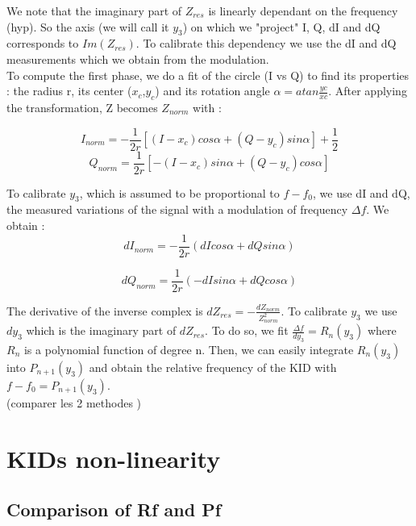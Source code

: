 \documentclass[english,11pt]{report}
\begin{document}
We note that the imaginary part of $Z_{res}$ is linearly dependant on the frequency (hyp). So the axis (we will call it $y_{3}$) on which we "project" I, Q, dI and dQ corresponds to $Im(Z_{res})$. To calibrate this dependency we use the dI and dQ measurements which we obtain from the modulation. \\

To compute the first phase, we do a fit of the circle (I vs Q) to find its properties : the radius r, its center ($x_{c}$,$y_{c}$) and its rotation angle $\alpha = atan \frac{yc}{xc}$. After applying the transformation, Z becomes $Z_{norm}$ with :

\begin{equation}
I_{norm} = - \frac{1}{2r}[(I-x_{c})cos\alpha + (Q - y_{c})sin \alpha] + \frac{1}{2}
\end{equation}
\begin{equation}
 Q_{norm} = \frac{1}{2r}[-(I-x_{c})sin\alpha + (Q - y_{c})cos \alpha] 
\end{equation}

To calibrate $y_{3}$, which is assumed to be proportional to $f-f_{0}$, we use dI and dQ, the measured variations of the signal with a modulation of frequency  $\Delta f$. We obtain : 
\begin{equation}
dI_{norm} = -\frac{1}{2r}(dI cos\alpha + dQ sin\alpha)
\end{equation}

\begin{equation}
dQ_{norm} = \frac{1}{2r}(-dI sin\alpha + dQ cos\alpha)
\end{equation}

The derivative of the inverse complex is $dZ_{res} = -\frac{dZ_{norm}}{Z_{norm}^{2}}$. To calibrate $y_{3}$ we use $dy_{3}$ which is the imaginary part of $dZ_{res}$. To do so, we fit $ \frac{\Delta f }{dy_{3}} = R_{n}(y_{3})$ where $R_{n}$ is a polynomial function of degree n. Then, we can easily integrate  $R_{n}(y_{3})$ into $P_{n+1}(y_{3})$ and obtain the relative frequency of the KID with $f-f_{0} = P_{n+1}(y_{3})$.\\

(comparer les 2 methodes )

 \section{KIDs non-linearity}
 \subsection{Comparison of Rf and Pf}
 
\end{document}
